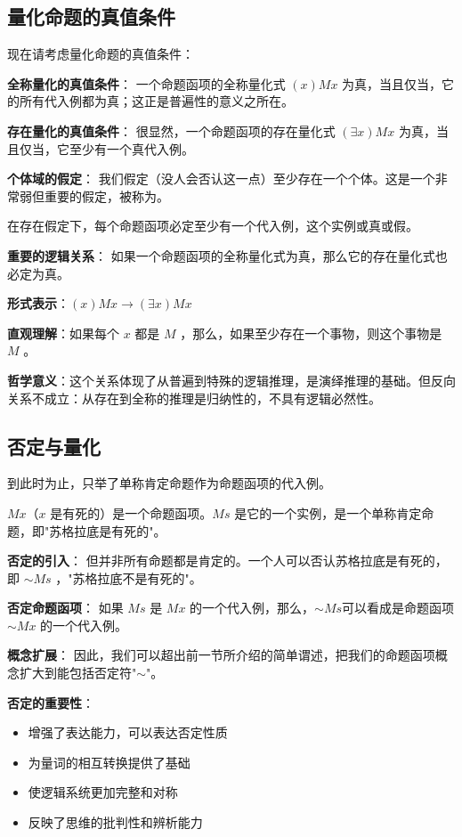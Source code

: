 \subsection{量化命题的真值条件}

\begin{theorembox}[title=量化命题真值条件的精确定义]
现在请考虑量化命题的真值条件：

\textbf{全称量化的真值条件}：
一个命题函项的全称量化式 $(x) M x$ 为真，当且仅当，它的所有代入例都为真；这正是普遍性的意义之所在。

\textbf{存在量化的真值条件}：
很显然，一个命题函项的存在量化式 $(\exists x) M x$ 为真，当且仅当，它至少有一个真代入例。

\textbf{个体域的假定}：
我们假定（没人会否认这一点）至少存在一个个体。这是一个非常弱但重要的假定，被称为。
\end{theorembox}

\begin{examplebox}[title=量词间的逻辑关系]
在存在假定下，每个命题函项必定至少有一个代入例，这个实例或真或假。

\textbf{重要的逻辑关系}：
如果一个命题函项的全称量化式为真，那么它的存在量化式也必定为真。

\textbf{形式表示}：$(x)Mx \rightarrow (\exists x)Mx$

\textbf{直观理解}：如果每个 $x$ 都是 $M$ ，那么，如果至少存在一个事物，则这个事物是 $M$ 。

\textbf{哲学意义}：这个关系体现了从普遍到特殊的逻辑推理，是演绎推理的基础。但反向关系不成立：从存在到全称的推理是归纳性的，不具有逻辑必然性。
\end{examplebox}

\subsection{否定与量化}

到此时为止，只举了单称肯定命题作为命题函项的代入例。

\begin{theorembox}[title=否定在命题函项中的作用]
$M x$（$x$ 是有死的）是一个命题函项。$M s$ 是它的一个实例，是一个单称肯定命题，即"苏格拉底是有死的"。

\textbf{否定的引入}：
但并非所有命题都是肯定的。一个人可以否认苏格拉底是有死的，即 $\sim M s$ ，"苏格拉底不是有死的"。

\textbf{否定命题函项}：
如果 $M s$ 是 $M x$ 的一个代入例，那么，$\sim Ms$可以看成是命题函项 $\sim M x$ 的一个代入例。

\textbf{概念扩展}：
因此，我们可以超出前一节所介绍的简单谓述，把我们的命题函项概念扩大到能包括否定符"$\sim$"。

\textbf{否定的重要性}：
\begin{itemize}
\item 增强了表达能力，可以表达否定性质
\item 为量词的相互转换提供了基础
\item 使逻辑系统更加完整和对称
\item 反映了思维的批判性和辨析能力
\end{itemize}
\end{theorembox}

